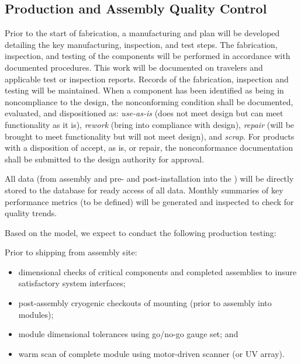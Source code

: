 \subsection{Production and Assembly Quality Control}
\label{sec:fdsp-pd-prodqc}


Prior to the start of fabrication, a manufacturing and  plan will be developed detailing the key manufacturing, inspection, and test steps.  The fabrication, inspection, and testing of the components will be performed in accordance with documented procedures. This work will be documented on travelers and applicable test or inspection reports. Records of the fabrication, inspection and testing will be maintained. When a component has been identified as being in noncompliance to the design, the nonconforming condition shall be documented, evaluated, and dispositioned as: \textit{use-as-is} (does not meet design but can meet functionality as it is), \textit{rework} (bring into compliance with design), \textit{repair} (will be brought to meet functionality but will not meet design), and \textit{scrap}. For products with a disposition of accept, as is, or repair, the nonconformance documentation shall be submitted to the design authority for approval.   

All  data  (from assembly and pre- and post-installation into the ) will be directly stored to the  database for ready access of all  data.  Monthly summaries of key performance metrics (to be defined) will be generated and inspected to check for quality trends.

Based on the  model, we expect to conduct the following production testing:

Prior to shipping from assembly site:
\begin{itemize}
\item dimensional checks of critical components and completed assemblies to insure satisfactory system interfaces;
\item post-assembly cryogenic checkouts of  mounting  (prior to assembly into  modules);
\item module dimensional tolerances using go/no-go gauge set; and
\item warm scan of complete module using motor-driven  scanner (or UV   array).
\end{itemize}

